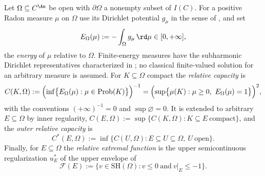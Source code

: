 \begin{definition}
\label{def:ch25-thuillier-capacity}
Let $\Omega\subseteq C^{\An}$ be open with $\partial\Omega$ a nonempty
subset of $I(C)$.  For a positive Radon measure $\mu$ on $\Omega$ use its Dirichlet
potential $g_\mu$ in the sense of \cite[\S3.4.3]{Thu05}, and set
\[
 E_\Omega(\mu):=-\int_\Omega g_\mu\,\rd\mu\in[0,+\infty] ,
\]
the \emph{energy} of $\mu$ relative to $\Omega$.  Finite-energy
measures have the subharmonic Dirichlet representatives characterized in
\cite[Proposition~3.5.10]{Thu05}; no classical finite-valued solution
for an arbitrary measure is assumed.  For $K\subseteq\Omega$
compact the \emph{relative capacity} is
\begin{equation}
\label{eq:ch25-thuillier-capacity}
 C(K,\Omega):=\Bigl(\inf\bigl\{E_\Omega(\mu):
   \mu\in\operatorname{Prob}(K)\bigr\}\Bigr)^{-1}
 =\Bigl(\sup\bigl\{\mu(K):\mu\geq0,\ E_\Omega(\mu)=1\bigr\}\Bigr)^{2},
\end{equation}
with the conventions $(+\infty)^{-1}=0$ and $\sup\varnothing=0$.  It is
extended to arbitrary $E\subseteq\Omega$ by inner regularity,
$C(E,\Omega):=\sup\{C(K,\Omega):K\subseteq E\ \text{compact}\}$, and the
\emph{outer relative capacity} is
\begin{equation}
\label{eq:ch25-thuillier-outer}
 C^*(E,\Omega):=\inf\bigl\{C(U,\Omega):
    E\subseteq U\subseteq\Omega,\ U\ \text{open}\bigr\}.
\end{equation}
Finally, for $E\subseteq\Omega$ the \emph{relative extremal function} is
the upper semicontinuous regularization $u^*_E$ of the upper envelope of
\[
 \mathcal F(E):=\bigl\{v\in\mathrm{SH}(\Omega):v\leq0\ \text{and}\
    v|_E\leq-1\bigr\}.
\]
\end{definition}

